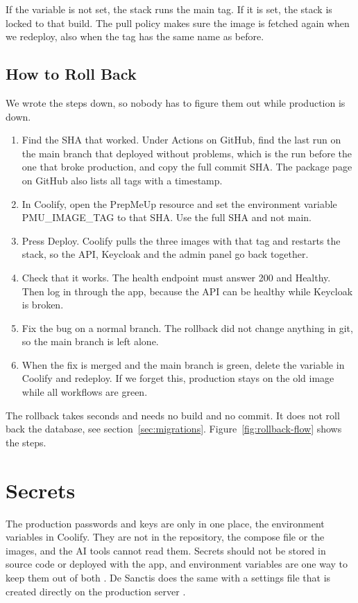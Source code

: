 \documentclass[a4paper,11pt]{article}
\begin{document}
If the variable is not set, the stack runs the main tag. If it is set, the stack is locked to that build. The pull policy makes sure the image is fetched again when we redeploy, also when the tag has the same name as before.

\subsection{How to Roll Back}
We wrote the steps down, so nobody has to figure them out while production is down.

\begin{enumerate}
    \item Find the SHA that worked. Under Actions on GitHub, find the last run on the main branch that deployed without problems, which is the run before the one that broke production, and copy the full commit SHA. The package page on GitHub also lists all tags with a timestamp.
    \item In Coolify, open the PrepMeUp resource and set the environment variable PMU\_IMAGE\_TAG to that SHA. Use the full SHA and not main.
    \item Press Deploy. Coolify pulls the three images with that tag and restarts the stack, so the API, Keycloak and the admin panel go back together.
    \item Check that it works. The health endpoint must answer 200 and Healthy. Then log in through the app, because the API can be healthy while Keycloak is broken.
    \item Fix the bug on a normal branch. The rollback did not change anything in git, so the main branch is left alone.
    \item When the fix is merged and the main branch is green, delete the variable in Coolify and redeploy. If we forget this, production stays on the old image while all workflows are green.
\end{enumerate}


The rollback takes seconds and needs no build and no commit. It does not roll back the database, see section~\ref{sec:migrations}. Figure~\ref{fig:rollback-flow} shows the steps.

\section{Secrets}\label{sec:secrets}
The production passwords and keys are only in one place, the environment variables in Coolify. They are not in the repository, the compose file or the images, and the AI tools cannot read them. Secrets should not be stored in source code or deployed with the app, and environment variables are one way to keep them out of both \cite{microsoft-aspnetcore-app-secrets}. De Sanctis does the same with a settings file that is created directly on the production server \cite[sec.~12.1.4]{desanctis-web-apis-aspnet-core}.
\end{document}
